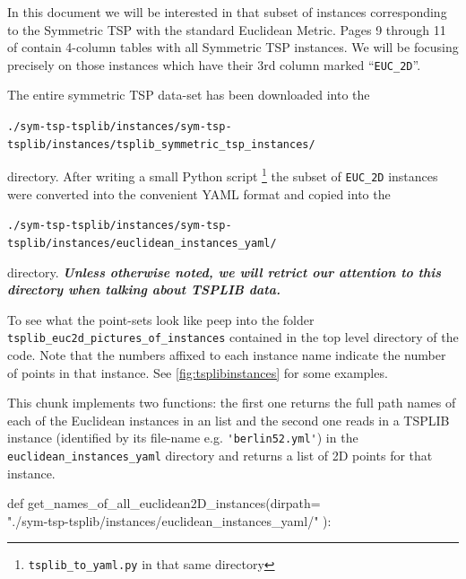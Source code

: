 In this document we will be interested in that subset of instances corresponding to the Symmetric TSP with the standard 
Euclidean Metric. Pages 9 through 11 of \cite{reinelt1991tsplib} contain 4-column tables with all Symmetric TSP instances. 
We will be focusing precisely on those instances which have their 3rd column marked ``\verb|EUC_2D|''.  

The entire symmetric TSP data-set has been downloaded into the 

\begin{displayquote}
\texttt{./sym-tsp-tsplib/instances/sym-tsp-tsplib/instances/tsplib\_symmetric\_tsp\_instances/} 
\end{displayquote}

directory. 
After writing a small Python script \footnote{\texttt{tsplib\_to\_yaml.py} in that same directory} the subset of \verb|EUC_2D| instances
were converted into the convenient YAML format and copied into the 

\begin{displayquote}
\color{blue}
\texttt{./sym-tsp-tsplib/instances/sym-tsp-tsplib/instances/euclidean\_instances\_yaml/} 
\end{displayquote}
directory. \textit{\textbf{Unless otherwise noted, we will retrict our attention to this directory when talking about TSPLIB data.}}

To see what the point-sets look like peep into the folder \verb|tsplib_euc2d_pictures_of_instances| contained in the top level directory of the code. 
Note that the numbers affixed to each instance name indicate the number of points in that instance. See \autoref{fig:tsplibinstances} for some examples. 

This chunk implements two functions: the first one returns the full path names of each of the Euclidean instances in an list and  the second one
reads in a TSPLIB instance (identified by its file-name e.g. \verb|'berlin52.yml'|) in the \verb|euclidean_instances_yaml| directory 
and returns a list of 2D points for that instance. 

\nwenddocs{}\endmoddef\nwstartdeflinemarkup{}\nwenddeflinemarkup

def get_names_of_all_euclidean2D_instances(dirpath=\\
         "./sym-tsp-tsplib/instances/euclidean_instances_yaml/" ):
     

